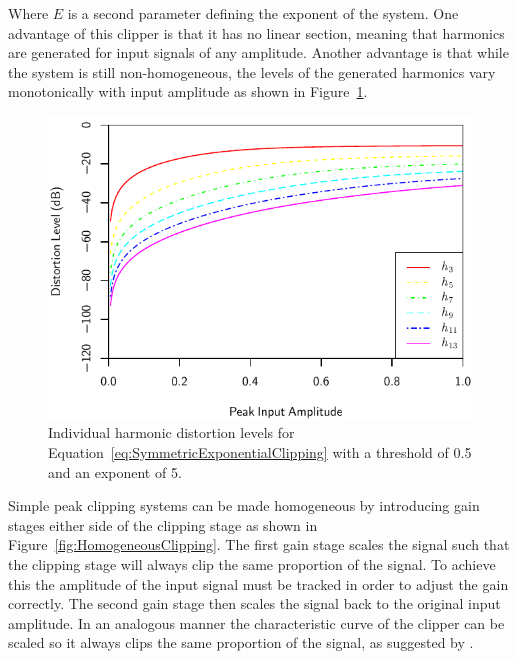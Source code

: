 			Where $E$ is a second parameter defining the exponent of the system. One advantage of this clipper
			is that it has no linear section, meaning that harmonics are generated for input signals of any
			amplitude. Another advantage is that while the system is still non-homogeneous, the levels of the
			generated harmonics vary monotonically with input amplitude as shown in
			Figure~\ref{fig:ExponentialClippingHarmonics}.

			\begin{figure}[h!]
				\centering
				\includegraphics{chapter5/Images/ExponentialClippingHarmonics.pdf}
				\caption{Individual harmonic distortion levels for
					 Equation~\ref{eq:SymmetricExponentialClipping} with a threshold of 0.5 and an 
				         exponent of 5.}
				\label{fig:ExponentialClippingHarmonics}
			\end{figure}

			Simple peak clipping systems can be made homogeneous by introducing gain stages either side of the
			clipping stage as shown in Figure~\ref{fig:HomogeneousClipping}. The first gain stage scales the
			signal such that the clipping stage will always clip the same proportion of the signal. To achieve
			this the amplitude of the input signal must be tracked in order to adjust the gain correctly. The
			second gain stage then scales the signal back to the original input amplitude. In an analogous
			manner the characteristic curve of the clipper can be scaled so it always clips the same proportion
			of the signal, as suggested by \citet{deman2014adaptive}.

